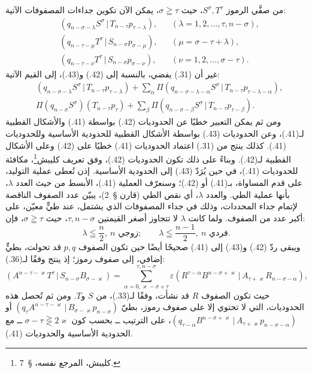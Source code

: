 \documentclass[11pt]{article}
\providecommand{\pair}[2]{(#1\,|\,#2)}
\providecommand{\eps}{\varepsilon}
\begin{document}
من صفَّي الرموز $S^\sigma,T^\tau$، حيث $\sigma\geqq\tau$، يمكن الآن تكوين جداءات المصفوفات الآتية:
\begin{align}
&\pair{q_{n-\sigma-\lambda}S^\sigma}{T_{n-\tau}p_{\tau-\lambda}}, &&(\lambda=1,2,\ldots,\tau,n-\sigma),\tag{41}\\
&\pair{q_{n-\tau-\mu}T^\tau}{S_{n-\sigma}p_{\sigma-\mu}}, &&(\mu=\sigma-\tau+\lambda),\tag{42}\\
&\pair{q_{n-\tau-\nu}T^\tau}{S_{n-\sigma}p_{\sigma-\nu}}, &&(\nu=1,2,\ldots,\sigma-\tau).
\tag{43}
\end{align}
غير أن (31.) يفضي، بالنسبة إلى (42.) و(43.)، إلى القيم الآتية:
\begin{align}
&\pair{q_{n-\sigma-\lambda}S^\sigma}{T_{n-\tau}p_{\tau-\lambda}}
 +\sum_{\alpha}\Pi\pair{q_{n-\sigma-\lambda-\alpha}S^\sigma}{T_{n-\tau}p_{\tau-\lambda-\alpha}},\tag{42a}\\
&\Pi(q_{n-\sigma}S^\sigma)(T_{n-\tau}p_\tau)
 +\sum_{\beta}\Pi\pair{q_{n-\sigma-\beta}S^\sigma}{T_{n-\tau}p_{\tau-\beta}}.
\tag{43a}
\end{align}
ومن ثم يمكن التعبير خطيًا عن الحدوديات (42.) بواسطة (41.) والأشكال القطبية لـ(41.)، وعن الحدوديات (43.) بواسطة الأشكال القطبية للحدودية الأساسية وللحدوديات (41.). كذلك ينتج من (31.) اعتماد الحدوديات (41.) خطيًا على (42.) وعلى الأشكال القطبية لـ(42.). وبناءً على ذلك تكون الحدوديات (42.)، وفق تعريف كليبش\footnote{كليبش، المرجع نفسه، \S\ 7.}، مكافئة للحدوديات (41.)، في حين يُرَدّ (43.) إلى الحدودية الأساسية. إذن تُعطى عملية التوليد، على قدم المساواة، بـ(41.) أو (42.)؛ وسنعرّف العملية (41.)، الأبسط من حيث العدد $\lambda$، بأنها عملية الطي. والعدد $\lambda$، أي نقص الطي (قارن \S\ 2)، يبيّن عدد الصفوف الناقصة لإتمام جداء المحددات، وذلك في جداء المصفوفات الذي يشتمل، عند طيٍّ معيّن، على أكبر عدد من الصفوف. ولما كانت $\lambda$ لا تتجاوز أصغر القيمتين $\tau,n-\sigma$، حيث $\sigma\geqq\tau$، فإن:
\begin{equation}
 \lambda\leqq\frac n2,\ n\text{ زوجي};\qquad
 \lambda\leqq\frac{n-1}{2},\ n\text{ فردي}.
\tag{44}
\end{equation}
ويبقى ردّ (42.) و(43.) إلى (41.) صحيحًا أيضًا حين تكون الصفوف $p,q$ قد تحولت، بطيٍّ إضافي، إلى صفوف رموز؛ إذ ينتج وفقًا لـ(36.):
\[
 \pair{A^{n-\tau-\varkappa}T^\tau}{S_{n-\sigma}B_{\sigma-\varkappa}}
 =\sum_{\alpha=0,\varkappa-\sigma+\tau}^{\tau,n-\sigma}
 \eps\pair{R^{\tau-\alpha}B^{n-\sigma+\varkappa}}{A_{\tau+\varkappa}R_{n-\sigma-\alpha}},
\]
حيث تكون الصفوف $R$ قد نشأت، وفقًا لـ(33.)، من $S$ و$T$. ومن ثم تُحصل هذه الحدوديات، التي لا تحتوي إلا على صفوف رموز، بطيّ $\pair{q_\tau A^{n-\tau-\varkappa}}{B_{\sigma-\varkappa}p_{n-\sigma}}$ أو $\pair{q_{\tau-\alpha}B^{n-\sigma+\varkappa}}{A_{\tau+\varkappa}p_{n-\sigma-\alpha}}$، على الترتيب ــ بحسب كون $\sigma-\tau\gtreqless 2\varkappa$ ــ مع الحدودية الأساسية والحدوديات (41.).
\end{document}
